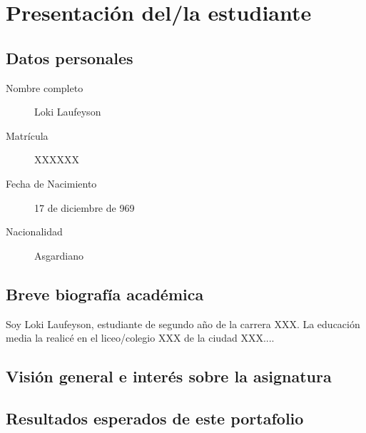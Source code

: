 \documentclass[../portafolio.tex]{subfiles}
\begin{document}
\chapter*{Presentación del/la estudiante}


\section*{Datos personales}
\begin{description}
\item[{Nombre completo}] Loki Laufeyson  %
\item[{Matrícula}] XXXXXX     %
\item[{Fecha de Nacimiento}] 17 de diciembre de 969   %
\item[{Nacionalidad}] Asgardiano
\end{description}


\section*{Breve biografía académica}
Soy Loki Laufeyson, estudiante de segundo año de la carrera XXX. La educación media la realicé en el liceo/colegio XXX de la ciudad XXX....


\section*{Visión general e interés sobre la asignatura}


\section*{Resultados esperados de este portafolio}
\end{document}
